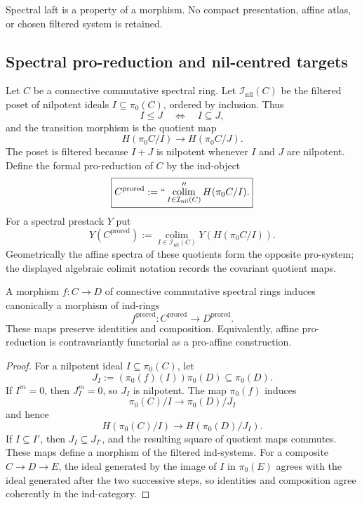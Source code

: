 \begin{remark}
Spectral laft is a property of a morphism.  No compact presentation, affine
atlas, or chosen filtered system is retained.
\end{remark}

\subsection{Spectral pro-reduction and nil-centred targets}

\begin{definition}
\label{def:bnli-prored-affine}
Let $C$ be a connective commutative spectral ring.  Let
$\mathcal I_{\mathrm{nil}}(C)$ be the filtered poset of nilpotent ideals
$I\subseteq\pi_0(C)$, ordered by inclusion.  Thus
\[
    I\leq J \quad\Longleftrightarrow\quad I\subseteq J,
\]
and the transition morphism is the quotient map
\[
    H(\pi_0C/I)\longrightarrow H(\pi_0C/J).
\]
The poset is filtered because $I+J$ is nilpotent whenever $I$ and $J$ are
nilpotent.  Define the formal pro-reduction of $C$ by the ind-object
\[
\boxed{
    C^{\mathrm{prored}}
    :=
    ``\operatorname*{colim}_{I\in\mathcal I_{\mathrm{nil}}(C)}''
    H(\pi_0C/I).}
\]
For a spectral prestack $Y$ put
\[
\boxed{
    Y(C^{\mathrm{prored}})
    :=
    \operatorname*{colim}_{I\in\mathcal I_{\mathrm{nil}}(C)}
    Y\!\left(H(\pi_0C/I)\right).}
\]
Geometrically the affine spectra of these quotients form the opposite
pro-system; the displayed algebraic colimit notation records the covariant
quotient maps.
\end{definition}

\begin{lemma}
\label{lem:bnli-prored-functoriality}
A morphism $f:C\to D$ of connective commutative spectral rings induces
canonically a morphism of ind-rings
\[
    f^{\mathrm{prored}}:
    C^{\mathrm{prored}}\longrightarrow D^{\mathrm{prored}}.
\]
These maps preserve identities and composition.  Equivalently, affine
pro-reduction is contravariantly functorial as a pro-affine construction.
\end{lemma}

\begin{proof}
For a nilpotent ideal $I\subseteq\pi_0(C)$, let
\[
    J_I:=(\pi_0(f)(I))\pi_0(D)\subseteq\pi_0(D).
\]
If $I^m=0$, then $J_I^m=0$, so $J_I$ is nilpotent.  The map $\pi_0(f)$
induces
\[
    \pi_0(C)/I\longrightarrow\pi_0(D)/J_I
\]
and hence
\[
    H(\pi_0(C)/I)\longrightarrow H(\pi_0(D)/J_I).
\]
If $I\subseteq I'$, then $J_I\subseteq J_{I'}$, and the resulting square of
quotient maps commutes.  These maps define a morphism of the filtered
ind-systems.  For a composite $C\to D\to E$, the ideal generated by the image
of $I$ in $\pi_0(E)$ agrees with the ideal generated after the two successive
steps, so identities and composition agree coherently in the ind-category.
\end{proof}

